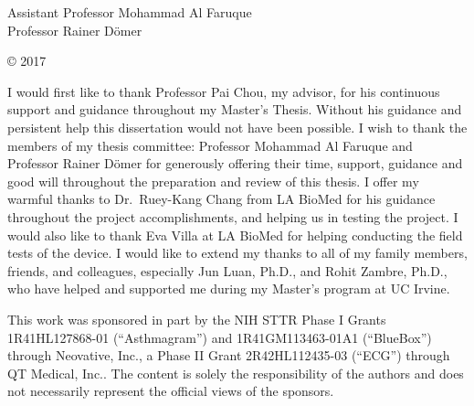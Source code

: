 



\othercommitteemembers
{
  Assistant Professor Mohammad Al Faruque\\
  Professor Rainer D{\"o}mer
}


\copyrightdeclaration
{
  {\copyright} {2017} \Authorname
}


  

\acknowledgments
{

I would first like to thank Professor Pai Chou, my advisor, for his
continuous support and guidance throughout my Master's Thesis.
Without his guidance and persistent help this dissertation would not
have been possible. I wish to thank the members of my thesis
committee: Professor Mohammad Al Faruque and Professor Rainer
D{\"o}mer for generously offering their time, support, guidance and
good will throughout the preparation and review of this thesis. I
offer my warmful thanks to Dr.\ Ruey-Kang Chang from LA BioMed for his
guidance throughout the project accomplishments, and helping us in
testing the project. I would also like to thank Eva Villa at LA BioMed
for helping conducting the field tests of the device. I would like to
extend my thanks to all of my family members, friends, and colleagues,
especially Jun Luan, Ph.D., and Rohit Zambre, Ph.D., who have helped
and supported me during my Master's program at UC Irvine.   

This work was sponsored in part by the NIH STTR Phase I Grants
1R41HL127868-01 (``Asthmagram'') and 1R41GM113463-01A1 (``BlueBox'')
through Neovative, Inc., a Phase II Grant 2R42HL112435-03 (``ECG'')
through QT Medical, Inc.. The content is solely the responsibility of
the authors and does not necessarily represent the official views of
the sponsors.
}


